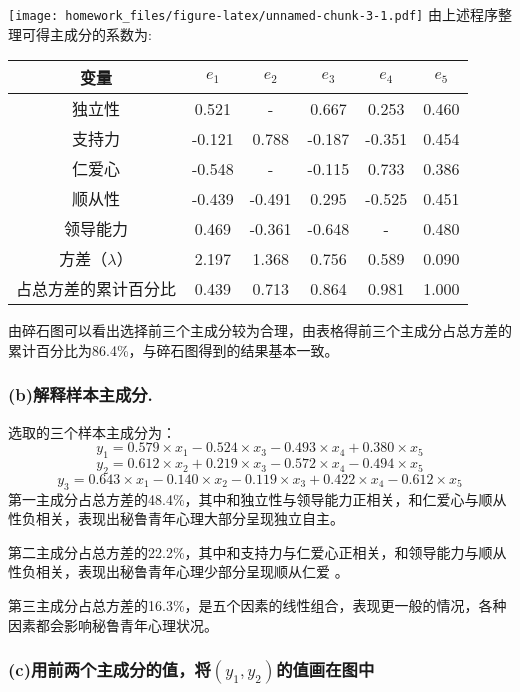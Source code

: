 \documentclass[
]{article}
\begin{document}
\texttt{[image: homework\_files/figure-latex/unnamed-chunk-3-1.pdf]}
由上述程序整理可得主成分的系数为:

\begin{longtable}[]{@{}cccccc@{}}
\toprule
变量 & \(e_{1}\) & \(e_{2}\) & \(e_{3}\) & \(e_{4}\) &
\(e_{5}\)\tabularnewline
\midrule
\endhead
独立性 & 0.521 & - & 0.667 & 0.253 & 0.460\tabularnewline
支持力 & -0.121 & 0.788 & -0.187 & -0.351 & 0.454\tabularnewline
仁爱心 & -0.548 & - & -0.115 & 0.733 & 0.386\tabularnewline
顺从性 & -0.439 & -0.491 & 0.295 & -0.525 & 0.451\tabularnewline
领导能力 & 0.469 & -0.361 & -0.648 & - & 0.480\tabularnewline
方差（$\lambda$） & 2.197 & 1.368 & 0.756 & 0.589 &
0.090\tabularnewline
占总方差的累计百分比 & 0.439 & 0.713 & 0.864 & 0.981 &
1.000\tabularnewline
\bottomrule
\end{longtable}

由碎石图可以看出选择前三个主成分较为合理，由表格得前三个主成分占总方差的累计百分比为86.4\%，与碎石图得到的结果基本一致。

\hypertarget{bux89e3ux91caux6837ux672cux4e3bux6210ux5206.}{%
\subsubsection{(b)解释样本主成分.}\label{bux89e3ux91caux6837ux672cux4e3bux6210ux5206.}}

选取的三个样本主成分为： 
$$
y_{1}=0.579\times x_{1}-0.524\times x_{3}-0.493\times x_{4}+0.380\times x_{5}
$$
$$
y_{2}=0.612\times x_{2}+0.219\times x_{3}-0.572\times x_{4}-0.494\times x_{5}
$$
$$
y_{3}=0.643\times x_{1}-0.140\times x_{2}-0.119\times x_{3}+0.422\times x_{4}-0.612\times x_{5}
$$
第一主成分占总方差的48.4\%，其中和独立性与领导能力正相关，和仁爱心与顺从性负相关，表现出秘鲁青年心理大部分呈现独立自主。

第二主成分占总方差的22.2\%，其中和支持力与仁爱心正相关，和领导能力与顺从性负相关，表现出秘鲁青年心理少部分呈现顺从仁爱
。

第三主成分占总方差的16.3\%，是五个因素的线性组合，表现更一般的情况，各种因素都会影响秘鲁青年心理状况。

\hypertarget{cux7528ux524dux4e24ux4e2aux4e3bux6210ux5206ux7684ux503cux5c06y_1y_2ux7684ux503cux753bux5728ux56feux4e2d}{%
\subsubsection{\texorpdfstring{(c)用前两个主成分的值，将\((y_{1},y_{2})\)的值画在图中}{(c)用前两个主成分的值，将(y\_\{1\},y\_\{2\})的值画在图中}}\label{cux7528ux524dux4e24ux4e2aux4e3bux6210ux5206ux7684ux503cux5c06y_1y_2ux7684ux503cux753bux5728ux56feux4e2d}}
\end{document}
